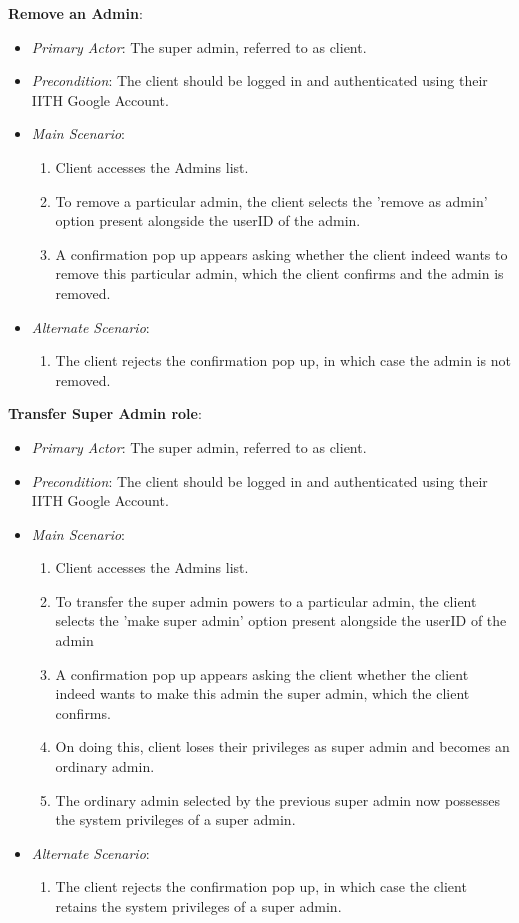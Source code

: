 \documentclass{article}
\begin{document}
\textbf{Remove an Admin}:
\label{ucremoveanadmin}
\begin{itemize}
    \item \textit{Primary Actor}: The super admin, referred to as client.
    \item \textit{Precondition}: The client should be logged in and authenticated using their IITH Google Account.
    \item \textit{Main Scenario}:
    \begin{enumerate}
        \item Client accesses the Admins list.
        \item To remove a particular admin, the client selects the 'remove as admin' option present alongside the userID of the admin.
        \item A confirmation pop up appears asking whether the client indeed wants to remove this particular admin, which the client confirms and the admin is removed.
    \end{enumerate}
    \item \textit{Alternate Scenario}:
    \begin{enumerate}
        \item The client rejects the confirmation pop up, in which case the admin is not removed.
    \end{enumerate}
\end{itemize}

\textbf{Transfer Super Admin role}:
\label{uctransfersuperadminrole}
\begin{itemize}
    \item \textit{Primary Actor}: The super admin, referred to as client.
    \item \textit{Precondition}: The client should be logged in and authenticated using their IITH Google Account.
    \item \textit{Main Scenario}:
    \begin{enumerate}
        \item Client accesses the Admins list.
        \item To transfer the super admin powers to a particular admin, the client selects the 'make super admin' option present alongside the userID of the admin
        \item A confirmation pop up appears asking the client whether the client indeed wants to make this admin the super admin, which the client confirms.
        \item On doing this, client loses their privileges as super admin and becomes an ordinary admin.
        \item The ordinary admin selected by the previous super admin now possesses the system privileges of a super admin. 
    \end{enumerate}
    \item \textit{Alternate Scenario}:
    \begin{enumerate}
        \item The client rejects the confirmation pop up, in which case the client retains the system privileges of a super admin.
    \end{enumerate}
    
\end{itemize}
\end{document}
